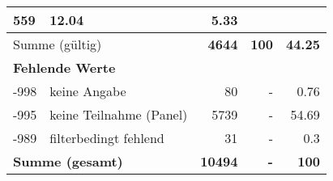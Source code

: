 \begin{longtable}{lXrrr}
       \num{559} &
       \num[round-mode=places,round-precision=2]{12,04} &
         \num[round-mode=places,round-precision=2]{5,33} \\
     \midrule
     \multicolumn{2}{l}{Summe (gültig)} &
       \textbf{\num{4644}} &
     \textbf{100} &
       \textbf{\num[round-mode=places,round-precision=2]{44,25}} \\
     \multicolumn{5}{l}{\textbf{Fehlende Werte}}\\
       -998 &
       keine Angabe &
         \num{80} &
        - &
         \num[round-mode=places,round-precision=2]{0,76} \\
       -995 &
       keine Teilnahme (Panel) &
         \num{5739} &
        - &
         \num[round-mode=places,round-precision=2]{54,69} \\
       -989 &
       filterbedingt fehlend &
         \num{31} &
        - &
         \num[round-mode=places,round-precision=2]{0,3} \\
     \midrule
     \multicolumn{2}{l}{\textbf{Summe (gesamt)}} &
          \textbf{\num{10494}} &
        \textbf{-} &
        \textbf{100} \\
     \bottomrule
     \end{longtable}
     
